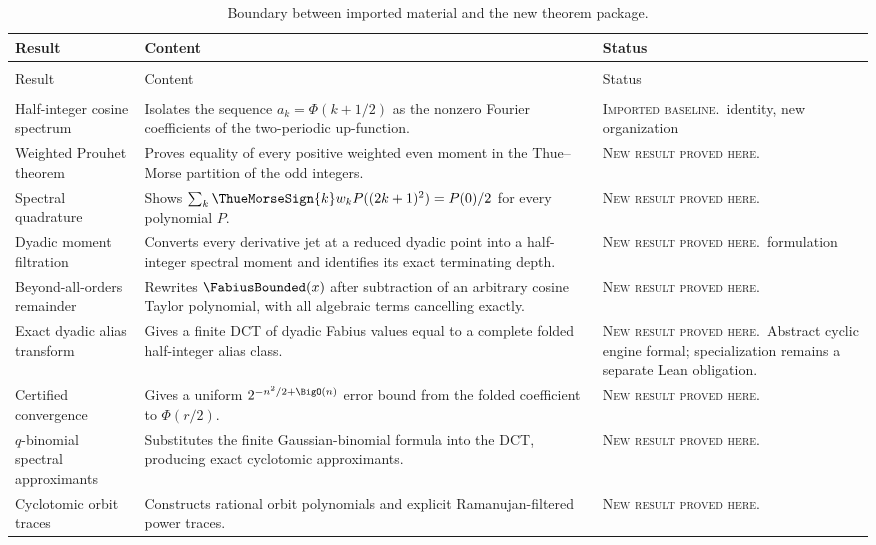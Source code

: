 \documentclass[11pt,oneside]{article}
\theoremstyle{definition}
\theoremstyle{remark}
\newcommand{\PhiU}{\Phi}
\newcommand{\newresult}{\textcolor{newgreen}{\textsc{New result proved here.}}}
\newcommand{\imported}{\textcolor{importblue}{\textsc{Imported baseline.}}}
\begin{document}
{\small
\begin{longtable}{@{}>{\raggedright\arraybackslash}p{}>{\raggedright\arraybackslash}p{}>{\raggedright\arraybackslash}p{}@{}}
\caption{Boundary between imported material and the new theorem package.}\label{p1:tab:contribution-map}\\
\toprule
Result & Content & Status \\
\midrule
\endfirsthead
\multicolumn{3}{c}{\small\itshape Contribution map (continued)}\\[0.3em]
\toprule
Result & Content & Status \\
\midrule
\endhead
\midrule
\multicolumn{3}{r}{\small\itshape Continued on the next page}\\
\endfoot
\bottomrule
\endlastfoot
Half-integer cosine spectrum & Isolates the sequence $a_k=\PhiU(k+1/2)$ as the nonzero Fourier coefficients of the two-periodic up-function. & \imported\ identity, new organization \\
Weighted Prouhet theorem & Proves equality of every positive weighted even moment in the Thue--Morse partition of the odd integers. & \newresult \\
Spectral quadrature & Shows $\sum_k\ThueMorseSign{k}w_kP((2k+1)^2)=P(0)/2$ for every polynomial $P$. & \newresult \\
Dyadic moment filtration & Converts every derivative jet at a reduced dyadic point into a half-integer spectral moment and identifies its exact terminating depth. & \newresult\ formulation \\
Beyond-all-orders remainder & Rewrites $\FabiusBounded(x)$ after subtraction of an arbitrary cosine Taylor polynomial, with all algebraic terms cancelling exactly. & \newresult \\
Exact dyadic alias transform & Gives a finite DCT of dyadic Fabius values equal to a complete folded half-integer alias class. & \newresult\ Abstract cyclic engine formal; specialization remains a separate Lean obligation. \\
Certified convergence & Gives a uniform $2^{-n^2/2+\BigO(n)}$ error bound from the folded coefficient to $\PhiU(r/2)$. & \newresult \\
$q$-binomial spectral approximants & Substitutes the finite Gaussian-binomial formula into the DCT, producing exact cyclotomic approximants. & \newresult \\
Cyclotomic orbit traces & Constructs rational orbit polynomials and explicit Ramanujan-filtered power traces. & \newresult \\

\end{longtable}}
\end{document}
